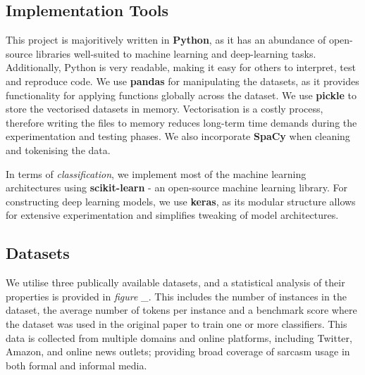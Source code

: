 \documentclass[12pt,a4paper]{article}
\begin{document}
\subsection{Implementation Tools}
\noindent This project is majoritively written in \textbf{Python}, as it has an abundance of open-source libraries well-suited to machine learning and deep-learning tasks. Additionally, Python is very readable, making it easy for others to interpret, test and reproduce code. We use \textbf{pandas} for manipulating the datasets, as it provides functionality for applying functions globally across the dataset. We use \textbf{pickle} to store the vectorised datasets in memory. Vectorisation is a costly process, therefore writing the files to memory reduces long-term time demands during the experimentation and testing phases. We also  incorporate \textbf{SpaCy} when cleaning and tokenising the data.

In terms of \textit{classification}, we implement most of the machine learning architectures using \textbf{scikit-learn} - an open-source machine learning library. For constructing deep learning models, we use \textbf{keras}, as its modular structure allows for extensive experimentation and simplifies tweaking of model architectures.

\subsection{Datasets}
\vspace{-4.2pt}\noindent We utilise three publically available datasets, and a statistical analysis of their properties is provided in \textit{figure \_}. This includes the number of instances in the dataset, the average number of tokens per instance and a benchmark score where the dataset was used in the original paper to train one or more classifiers. This data is collected from multiple domains and online platforms, including Twitter, Amazon, and online news outlets; providing broad coverage of sarcasm usage in both formal and informal media. \\
\end{document}
